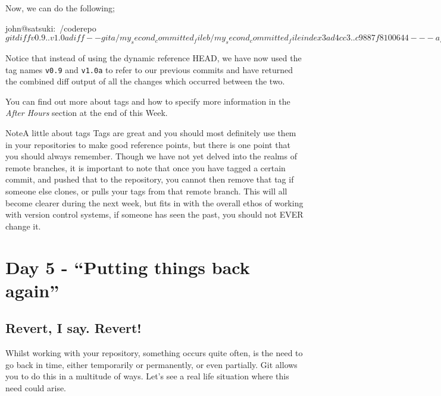 Now, we can do the following;

\begin{code}
john@satsuki:~/coderepo$ git diff v0.9..v1.0a
diff --git a/my_second_committed_file b/my_second_committed_file
index 3ad4cc3..c9887f8 100644
--- a/my_second_committed_file
+++ b/my_second_committed_file
@@ -1 +1 @@
-Change1
+Changed this file completely
diff --git a/my_third_committed_file b/my_third_committed_file
new file mode 100644
index 0000000..5d27866
--- /dev/null
+++ b/my_third_committed_file
@@ -0,0 +1 @@
+Addition to the line
john@satsuki:~/coderepo$
\end{code}

Notice that instead of using the dynamic reference HEAD, we have now used the tag names \texttt{v0.9} and \texttt{v1.0a} to refer to our previous commits and have returned the combined diff output of all the changes which occurred between the two.

You can find out more about tags and how to specify more information in the \emph{After Hours} section at the end of this Week.

\begin{callout}{Note}{A little about tags}
Tags are great and you should most definitely use them in your repositories to make good reference points, but there is one point that you should always remember.
Though we have not yet delved into the realms of remote branches, it is important to note that once you have tagged a certain commit, and pushed that to the repository, you cannot then remove that tag if someone else clones, or pulls your tags from that remote branch.
This will all become clearer during the next week, but fits in with the overall ethos of working with version control systems, if someone has seen the past, you should not EVER change it.
\end{callout}

\section{Day 5 - ``Putting things back again''}
\subsection{Revert, I say. Revert!}
Whilst working with your repository, something occurs quite often, is the need to go back in time, either temporarily or permanently, or even partially.
Git allows you to do this in a multitude of ways.
Let's see a real life situation where this need could arise.


